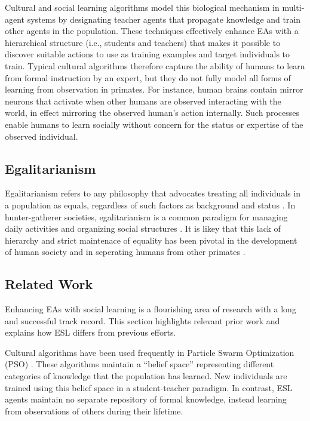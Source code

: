 \documentclass{sig-alternate}
\begin{document}
Cultural and social learning algorithms \cite{reynolds1994introduction} model this biological mechanism in multi-agent systems by designating teacher agents that propagate knowledge and train other agents in the population. These techniques effectively enhance EAs with a hierarchical structure (i.e., students and teachers) that makes it possible to discover suitable actions to use as training examples and target individuals to train. Typical cultural algorithms therefore capture the ability of humans to learn from formal instruction by an expert, but they do not fully model all forms of learning from observation in primates. For instance, human brains contain mirror neurons \cite{gallese-98} that activate when other humans are observed interacting with the world, in effect mirroring the observed human's action internally. Such processes enable humans to learn socially without concern for the status or expertise of the observed individual.

\subsection*{Egalitarianism}

Egalitarianism refers to any philosophy that advocates treating all individuals in a population as equals, regardless of such factors as background and status \cite{sep2009egalitarianism}. In hunter-gatherer societies, egalitarianism is a common paradigm for managing daily activities and organizing social structures \cite{boehm2001hierarchy}. It is likey that this lack of hierarchy and strict maintenace of equality has been pivotal in the development of human society and in seperating humans from other primates \cite{erda1996egalitarianism}. 

\subsection*{Related Work}

Enhancing EAs with social learning is a flourishing area of research with a long and successful track record. This section highlights relevant prior work and explains how ESL differs from previous efforts.

Cultural algorithms \cite{reynolds1994introduction} have been used frequently in Particle Swarm Optimization (PSO) \cite{kennedy1995particle}. These algorithms maintain a ``belief space'' representing different categories of knowledge that the population has learned. New individuals are trained using this belief space in a student-teacher paradigm. In contrast, ESL agents maintain no separate repository of formal knowledge, instead learning from observations of others during their lifetime.
\end{document}
